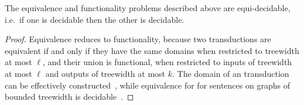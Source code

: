 \begin{fact}\label{fact:equi-decidable}
    The equivalence and functionality problems described above are equi-decidable, i.e.~if one is decidable then the other is decidable. 
\end{fact}
\begin{proof}
    Equivalence reduces to functionality, because two transductions are  equivalent if and only if they have the same domains when restricted to treewidth at most $\ell$, and their union is  functional, when restricted to inputs of treewidth at most $\ell$ and outputs of treewidth at most $k$.  The domain of an \mso transduction can be effectively constructed~\cite[Backwards Translation Theorem]{courcelleGraphStructureMonadic2012}, while equivalence for \mso for sentences on graphs of bounded treewidth is decidable~\cite[Theorem 5.80]{courcelleGraphStructureMonadic2012}.


\end{proof}
